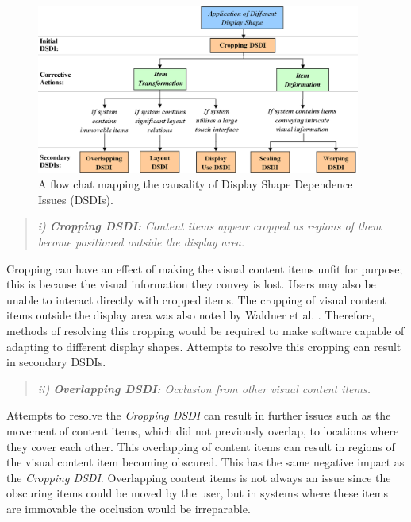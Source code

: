 \documentclass[twocolumn,compsoc]{cvm}
\begin{document}
\begin{figure}[h!]
 \centering
   \includegraphics[width=0.95\textwidth]{figures/DSDIFlowChart.jpeg}
   \caption{A flow chat mapping the causality of Display Shape Dependence Issues (DSDIs).}
   \label{fig:dsdiFlow}
\end{figure}

\begin{quote}\emph{i) \textbf{Cropping \ac{DSDI}:} Content items appear cropped as regions of them become positioned outside the display area.}\end{quote}

Cropping can have an effect of making the visual content items unfit for purpose; this is because the visual information they convey is lost.
Users may also be unable to interact directly with cropped items.
The cropping of visual content items outside the display area was also noted by Waldner et al. \cite{Waldner2011}.
Therefore, methods of resolving this cropping would be required to make software capable of adapting to different display shapes.
Attempts to resolve this cropping can result in secondary \acp{DSDI}.

\begin{quote}\emph{ii) \textbf{Overlapping \ac{DSDI}:} Occlusion from other visual content items.}\end{quote}

Attempts to resolve the {\emph{Cropping \ac{DSDI}}} can result in further issues such as the movement of content items, which did not previously overlap, to locations where they cover each other.
This overlapping of content items can result in regions of the visual content item becoming obscured.
This has the same negative impact as the {\emph{Cropping \ac{DSDI}}}.
Overlapping content items is not always an issue since the obscuring items could be moved by the user, but in systems where these items are immovable the occlusion would be irreparable.
\end{document}
